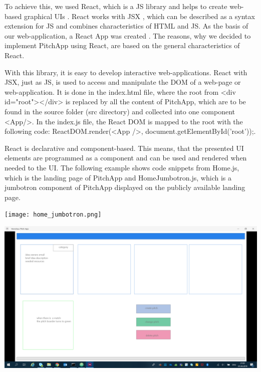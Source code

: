 To achieve this, we used React, which is a JS library and helps to create web-based graphical UIs \parencite{React}. React works with JSX \parencite{JSX}, which can be described as a syntax extension for JS and combines characteristics of HTML and JS. As the basis of our web-application, a React App was created \parencite{Reactstrap}. The reasons, why we decided to implement PitchApp using React, are based on the general characteristics of React.

With this library, it is easy to develop interactive web-applications. React with JSX, just as JS, is used to access and manipulate the DOM of a web-page or web-application. It is done in the index.html file, where the root from <div id="root"></div> is replaced by all the content of PitchApp, which are to be found in the source folder (src directory) and collected into one component <App/>. In the index.js file, the React DOM is mapped to the root with the following code: ReactDOM.render(<App />, document.getElementById('root'));.

React is declarative and component-based. This means, that the presented UI elements are programmed as a component and can be used and rendered when needed to the UI. The following example shows code snippets from Home.js, which is the landing page of PitchApp and HomeJumbotron.js, which is a jumbotron component of PitchApp displayed on the publicly available landing page.

\begin{center}
	\texttt{[image: home\_jumbotron.png]}
\end{center} 

\begin{center}
	\includegraphics{home.png}
\end{center} 

